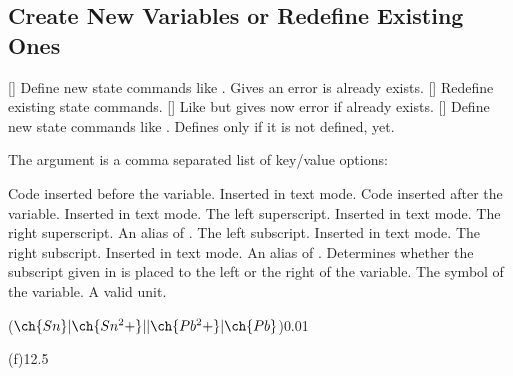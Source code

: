 \documentclass{chemmacros-manual}
\begin{document}
\subsection{Create New Variables or Redefine Existing Ones}

\begin{commands}
  []
    Define new state commands like .  Gives an error is 
    already exists.
  []
    Redefine existing state commands.
  []
    Like  but gives now error if  already exists.
  []
    Define new state commands like .  Defines  only if
    it is not defined, yet.
\end{commands}
The argument  is a comma separated list of key/value options:
\begin{options}
    Code inserted before the variable.  Inserted in text mode.
  \Initial
    Code inserted after the variable.  Inserted in text mode.
  \Initial
    The left superscript.  Inserted in text mode.
    The right superscript.
    An alias of .
  \Initial
    The left subscript.  Inserted in text mode.
  \Initial
    The right subscript.  Inserted in text mode.
    An alias of .
    Determines whether the subscript given in  is placed to the
    left or the right of the variable.
  \Initial
    The symbol of the variable.
  \Initial
    A valid  unit.
\end{options}

\begin{example}
  \NewChemState{}
  \NewChemState{}
   \par
   \par
  \ElPot[superscript=0]($\ch{Sn}|\ch{Sn^2+}||\ch{Pb^2+}|\ch{Pb}$){0.01} \par
  \RenewChemState{} \par
  \enthalpy(f){12.5}
\end{example}
\end{document}
